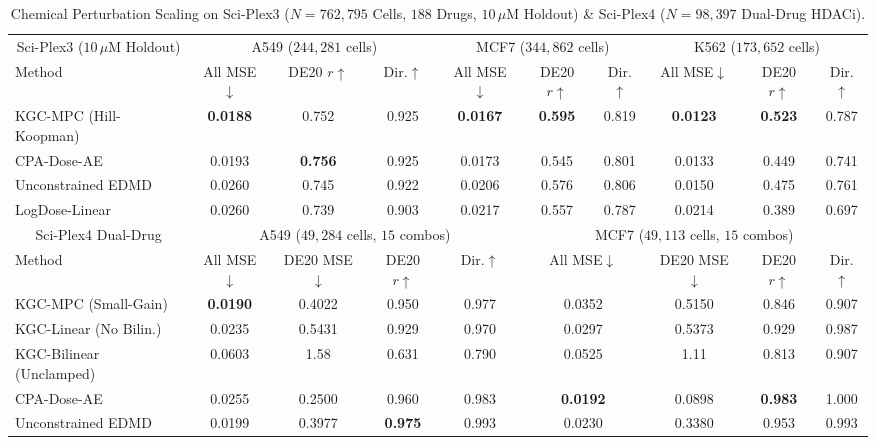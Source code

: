 \begin{table}[t]
\centering
\caption{Chemical Perturbation Scaling on Sci-Plex3 ($N=762{,}795$ Cells, $188$ Drugs, $10\,\mu\mathrm{M}$ Holdout) \& Sci-Plex4 ($N=98{,}397$ Dual-Drug HDACi).}
\label{tab:sciplex_chemical}
\scriptsize
\setlength{\tabcolsep}{3.6pt}
\begin{tabular}{l|ccc|ccc|ccc}
\toprule
\multicolumn{1}{c|}{Sci-Plex3 ($10\,\mu\mathrm{M}$ Holdout)} & \multicolumn{3}{c|}{A549 ($244{,}281$ cells)} & \multicolumn{3}{c|}{MCF7 ($344{,}862$ cells)} & \multicolumn{3}{c}{K562 ($173{,}652$ cells)} \\
Method & All MSE$\downarrow$ & DE20 $r\uparrow$ & Dir.$\uparrow$ & All MSE$\downarrow$ & DE20 $r\uparrow$ & Dir.$\uparrow$ & All MSE$\downarrow$ & DE20 $r\uparrow$ & Dir.$\uparrow$ \\
\midrule
KGC-MPC (Hill-Koopman) & \textbf{0.0188} & 0.752 & 0.925 & \textbf{0.0167} & \textbf{0.595} & 0.819 & \textbf{0.0123} & \textbf{0.523} & 0.787 \\
CPA-Dose-AE & 0.0193 & \textbf{0.756} & 0.925 & 0.0173 & 0.545 & 0.801 & 0.0133 & 0.449 & 0.741 \\
Unconstrained EDMD & 0.0260 & 0.745 & 0.922 & 0.0206 & 0.576 & 0.806 & 0.0150 & 0.475 & 0.761 \\
LogDose-Linear & 0.0260 & 0.739 & 0.903 & 0.0217 & 0.557 & 0.787 & 0.0214 & 0.389 & 0.697 \\
\midrule
\multicolumn{1}{c|}{Sci-Plex4 Dual-Drug} & \multicolumn{4}{c|}{A549 ($49{,}284$ cells, $15$ combos)} & \multicolumn{5}{c}{MCF7 ($49{,}113$ cells, $15$ combos)} \\
Method & All MSE$\downarrow$ & DE20 MSE$\downarrow$ & \multicolumn{1}{c}{DE20 $r\uparrow$} & \multicolumn{1}{c|}{Dir.$\uparrow$} & \multicolumn{2}{c}{All MSE$\downarrow$} & \multicolumn{1}{c}{DE20 MSE$\downarrow$} & DE20 $r\uparrow$ & Dir.$\uparrow$ \\
\midrule
KGC-MPC (Small-Gain) & \textbf{0.0190} & 0.4022 & \multicolumn{1}{c}{0.950} & \multicolumn{1}{c|}{0.977} & \multicolumn{2}{c}{0.0352} & \multicolumn{1}{c}{0.5150} & 0.846 & 0.907 \\
KGC-Linear (No Bilin.) & 0.0235 & 0.5431 & \multicolumn{1}{c}{0.929} & \multicolumn{1}{c|}{0.970} & \multicolumn{2}{c}{0.0297} & \multicolumn{1}{c}{0.5373} & 0.929 & 0.987 \\
KGC-Bilinear (Unclamped) & 0.0603 & 1.58 & \multicolumn{1}{c}{0.631} & \multicolumn{1}{c|}{0.790} & \multicolumn{2}{c}{0.0525} & \multicolumn{1}{c}{1.11} & 0.813 & 0.907 \\
CPA-Dose-AE & 0.0255 & 0.2500 & \multicolumn{1}{c}{0.960} & \multicolumn{1}{c|}{0.983} & \multicolumn{2}{c}{\textbf{0.0192}} & \multicolumn{1}{c}{0.0898} & \textbf{0.983} & 1.000 \\
Unconstrained EDMD & 0.0199 & 0.3977 & \multicolumn{1}{c}{\textbf{0.975}} & \multicolumn{1}{c|}{0.993} & \multicolumn{2}{c}{0.0230} & \multicolumn{1}{c}{0.3380} & 0.953 & 0.993 \\
\bottomrule
\end{tabular}
\end{table}
